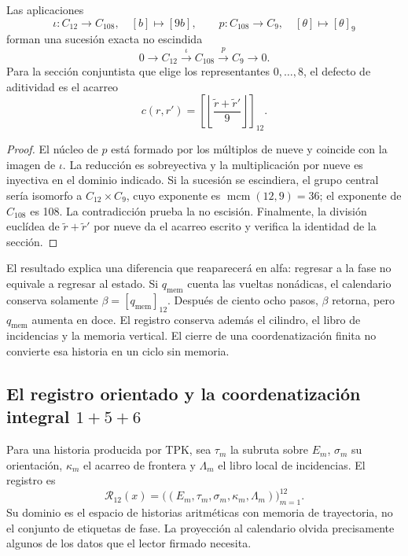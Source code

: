 \begin{proposition}
\label{prop:k-extension}
Las aplicaciones
\[
 \iota:C_{12}\longrightarrow C_{108},\quad[b]\longmapsto[9b],
 \qquad p:C_{108}\longrightarrow C_9,\quad[\theta]\longmapsto[\theta]_9
\]
forman una sucesión exacta no escindida
\[
 0\longrightarrow C_{12}\xrightarrow{\iota}C_{108}
 \xrightarrow{p}C_9\longrightarrow0.
\]
Para la sección conjuntista que elige los representantes
\(0,\ldots,8\), el defecto de aditividad es el acarreo
\[
 c(r,r')=\left[\left\lfloor\frac{\widetilde r+\widetilde r'}9\right\rfloor\right]_{12}.
\]
\end{proposition}

\begin{proof}
El núcleo de \(p\) está formado por los múltiplos de nueve y coincide con
la imagen de \(\iota\). La reducción es sobreyectiva y la multiplicación
por nueve es inyectiva en el dominio indicado. Si la sucesión se
escindiera, el grupo central sería isomorfo a \(C_{12}\times C_9\), cuyo
exponente es \(\operatorname{mcm}(12,9)=36\); el exponente de
\(C_{108}\) es 108. La contradicción prueba la no escisión. Finalmente,
la división euclídea de \(\widetilde r+\widetilde r'\) por nueve da el
acarreo escrito y verifica la identidad de la sección.
\end{proof}

El resultado explica una diferencia que reaparecerá en alfa: regresar a la
fase no equivale a regresar al estado. Si \(q_{\mathrm{mem}}\) cuenta las
vueltas nonádicas, el calendario conserva solamente
\(\beta=[q_{\mathrm{mem}}]_{12}\). Después de ciento ocho pasos,
\(\beta\) retorna, pero \(q_{\mathrm{mem}}\) aumenta en doce. El
registro conserva además el cilindro, el libro de incidencias y la memoria
vertical. El cierre de una coordenatización finita no convierte esa historia en un
ciclo sin memoria.

\subsection{El registro orientado y la coordenatización integral \texorpdfstring{\(1+5+6\)}{1+5+6}}
\label{subsec:k-registro-integral}

Para una historia producida por TPK, sea \(\tau_m\) la subruta sobre
\(E_m\), \(\sigma_m\) su orientación, \(\kappa_m\) el acarreo de
frontera y \(\Lambda_m\) el libro local de incidencias. El registro es
\[
 \mathcal R_{12}(x)=
 \bigl((E_m,\tau_m,\sigma_m,\kappa_m,\Lambda_m)\bigr)_{m=1}^{12}.
\]
Su dominio es el espacio de historias aritméticas con memoria de trayectoria, no el conjunto de
etiquetas de fase. La proyección al calendario olvida precisamente algunos
de los datos que el lector firmado necesita.

